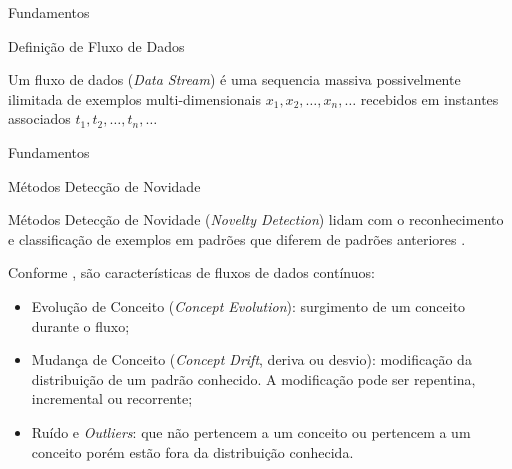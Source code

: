 \documentclass[aspectratio=43,10pt]{beamer}
\newcommand{\nota}[1]{\hspace*{-0.5cm}\textit{{\color[rgb]{1,0,0}Nota: #1}}}
\begin{document}
\begin{frame}[fragile]{Fundamentos}


\begin{block}{Definição de Fluxo de Dados}
  
  \vspace{1mm}

  Um fluxo de dados (\emph{Data Stream}) é uma sequencia massiva possivelmente
  ilimitada de exemplos multi-dimensionais $x_1, x_2, \dots, x_n, \dots$
  recebidos em instantes associados $t_1, t_2, \dots, t_n, \dots$

\end{block}
\end{frame}

\newcommand{\novelty}{\emph{Novelty Detection}\xspace}
\newcommand{\nd}{ND\xspace}
\newcommand{\drift}{\emph{Concept Drift}\xspace}
\newcommand{\evolution}{\emph{Concept Evolution}\xspace}

\begin{frame}[fragile]{Fundamentos}
  \begin{alertblock}{Métodos Detecção de Novidade}
    
    \vspace{1mm}
    Métodos Detecção de Novidade (\novelty) lidam com o reconhecimento e
    classificação de exemplos em padrões que diferem de padrões anteriores
    \cite{PERNER2007,Gama2010}.
  
    Conforme , são características de fluxos de dados contínuos:
    \begin{itemize}
      
      \item Evolução de Conceito (\evolution): surgimento de um conceito durante
      o fluxo;
      
      \item Mudança de Conceito (\drift, deriva ou desvio): modificação da
      distribuição de um padrão conhecido. A modificação pode ser repentina,
      incremental ou recorrente;
      
      \item Ruído e \emph{Outliers}: que não pertencem a um conceito ou
      pertencem a um conceito porém estão fora da distribuição conhecida.
      
    \end{itemize}
  \end{alertblock}
\end{frame}
\end{document}
